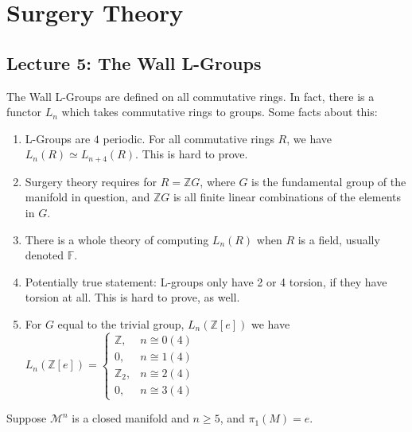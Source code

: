 \documentclass[crop=false,class=article,oneside]{standalone}
\begin{document}
    \ifx\ifmathcoursessurgery\undefined
        \section*{Surgery Theory}
        \setcounter{section}{1}
        \renewcommand\thesubfigure{%
            \arabic{section}.\arabic{figure}.\arabic{subfigure}%
        }
    \fi
    \subsection{Lecture 5: The Wall L-Groups}
        The Wall L-Groups are defined on all commutative rings.
        In fact, there is a functor $L_{n}$ which takes
        commutative rings to groups. Some facts about this:
        \begin{enumerate}
            \item L-Groups are $4$ periodic.
                  For all commutative rings $R$, we have
                  $L_{n}(R)\simeq L_{n+4}(R)$.
                  This is hard to prove.
            \item Surgery theory requires for
                  $R=\mathbb{Z}G$, where $G$ is the
                  fundamental group of the manifold in
                  question, and $\mathbb{Z}G$ is all
                  finite linear combinations of the elements
                  in $G$.
            \item There is a whole theory of computing
                  $L_{n}(R)$ when $R$ is a field,
                  usually denoted $\mathbb{F}$.
            \item Potentially true statement: L-groups
                  only have 2 or 4 torsion, if they have
                  torsion at all. This is hard to prove,
                  as well.
            \item For $G$ equal to the trivial group,
                  $L_{n}(\mathbb{Z}[e])$ we have
                  $L_{n}(\mathbb{Z}[e])%
                   =\begin{cases}%
                        \mathbb{Z},&n\cong{0}(4)\\%
                        0,&n\cong{1}(4)\\%
                        \mathbb{Z}_{2},&n\cong{2}(4)\\%
                        0,&n\cong{3}(4)%
                    \end{cases}$
        \end{enumerate}
        Suppose $\mathcal{M}^{n}$ is a closed
        manifold and $n\geq 5$, and $\pi_{1}(M)=e$.
\end{document}
